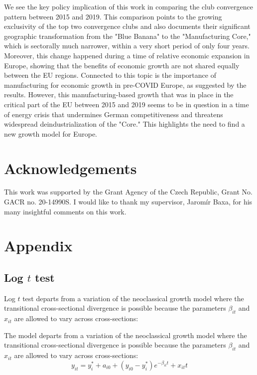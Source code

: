 \documentclass[11pt]{article}
\begin{document}
We see the key policy implication of this work in comparing the club convergence pattern between 2015 and 2019. This comparison points to the growing exclusivity of the top two convergence clubs and also documents their significant geographic transformation from the "Blue Banana" to the "Manufacturing Core," which is sectorally much narrower, within a very short period of only four years. Moreover, this change happened during a time of relative economic expansion in Europe, showing that the benefits of economic growth are not shared equally between the EU regions. Connected to this topic is the importance of manufacturing for economic growth in pre-COVID Europe, as suggested by the results. However, this manufacturing-based growth that was in place in the critical part of the EU between 2015 and 2019 seems to be in question in a time of energy crisis that undermines German competitiveness and threatens widespread deindustrialization of the "Core." This highlights the need to find a new growth model for Europe.

\section{Acknowledgements} 
This work was supported by the Grant Agency of the Czech Republic, Grant No. GACR no. 20-14990S. I would like to thank my supervisor, Jaromír Baxa, for his many insightful comments on this work.


\newpage


\appendix
\section{Appendix}
\setcounter{table}{0}
\renewcommand{\thetable}{A\arabic{table}}
\renewcommand{\thefigure}{A\arabic{figure}}
\setcounter{figure}{0}

\subsection{Log $t$ test}

Log $t$ test departs from a variation of the neoclassical growth model where the transitional cross-sectional divergence is possible because the parameters $\beta_{it}$ and $x_{it}$ are allowed to vary across cross-sections:

The model departs from a variation of the neoclassical growth model where the transitional cross-sectional divergence is possible because the parameters $\beta_{it}$ and $x_{it}$ are allowed to vary across cross-sections:
\begin{equation} \label{eq3}
 y_{it} = y_i^* + a_{i0} + (y_{i0} - y_i^*)e^{-\beta_{it}t} + x_{it}t 
\end{equation}
\end{document}
